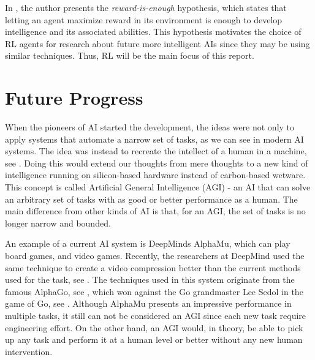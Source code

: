 \documentclass[12pt,A4]{report}
\theoremstyle{definition}
\begin{document}
In \citet{Silver21}, the author presents the \textit{reward-is-enough} hypothesis, which states that letting an agent maximize reward in its environment is enough to develop intelligence and its associated abilities. This hypothesis motivates the choice of RL agents for research about future more intelligent AIs since they may be using similar techniques. Thus, RL will be the main focus of this report. 




\section{Future Progress}
When the pioneers of AI started the development, the ideas were not only to apply systems that automate a narrow set of tasks, as we can see in modern AI systems. The idea was instead to recreate the intellect of a human in a machine, see \citet{Dartmouth}. Doing this would extend our thoughts from mere thoughts to a new kind of intelligence running on silicon-based hardware instead of carbon-based wetware. This concept is called Artificial General Intelligence (AGI) - an AI that can solve an arbitrary set of tasks with as good or better performance as a human. The main difference from other kinds of AI is that, for an AGI, the set of tasks is no longer narrow and bounded. 



An example of a current AI system is DeepMinds AlphaMu, which can play board games, and video games. Recently, the researchers at DeepMind used the same technique to create a video compression better than the current methods used for the task, see \citet{Mandhane}. The techniques used in this system originate from the famous AlphaGo, see \citet{Silver}, which won against the Go grandmaster Lee Sedol in the game of Go, see \citet{DeepMind}. Although AlphaMu presents an impressive performance in multiple tasks, it still can not be considered an AGI since each new task require engineering effort. On the other hand, an AGI would, in theory, be able to pick up any task and perform it at a human level or better without any new human intervention.
\end{document}
